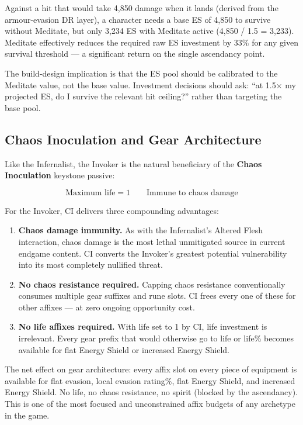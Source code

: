 \documentclass[12pt, letterpaper]{article}
\begin{document}
Against a hit that would take 4{,}850 damage when it lands (derived from the armour-evasion DR layer), a character needs a base ES of 4{,}850 to survive without Meditate, but only 3{,}234 ES with Meditate active (4{,}850 / 1.5 = 3{,}233). Meditate effectively reduces the required raw ES investment by 33\% for any given survival threshold --- a significant return on the single ascendancy point.

The build-design implication is that the ES pool should be calibrated to the Meditate value, not the base value. Investment decisions should ask: ``at 1.5$\times$ my projected ES, do I survive the relevant hit ceiling?'' rather than targeting the base pool.

\subsection*{Chaos Inoculation and Gear Architecture}

Like the Infernalist, the Invoker is the natural beneficiary of the \textbf{Chaos Inoculation} keystone passive:

\[
\text{Maximum life} = 1 \qquad \text{Immune to chaos damage}
\]

For the Invoker, CI delivers three compounding advantages:

\begin{enumerate}
    \item \textbf{Chaos damage immunity.} As with the Infernalist's Altered Flesh interaction, chaos damage is the most lethal unmitigated source in current endgame content. CI converts the Invoker's greatest potential vulnerability into its most completely nullified threat.
    \item \textbf{No chaos resistance required.} Capping chaos resistance conventionally consumes multiple gear suffixes and rune slots. CI frees every one of these for other affixes --- at zero ongoing opportunity cost.
    \item \textbf{No life affixes required.} With life set to 1 by CI, life investment is irrelevant. Every gear prefix that would otherwise go to life or life\% becomes available for flat Energy Shield or increased Energy Shield.
\end{enumerate}

The net effect on gear architecture: every affix slot on every piece of equipment is available for flat evasion, local evasion rating\%, flat Energy Shield, and increased Energy Shield. No life, no chaos resistance, no spirit (blocked by the ascendancy). This is one of the most focused and unconstrained affix budgets of any archetype in the game.
\end{document}
